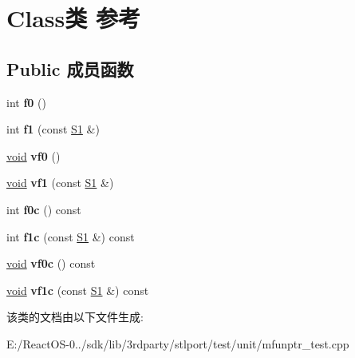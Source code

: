 \hypertarget{class_class}{}\section{Class类 参考}
\label{class_class}
\subsection*{Public 成员函数}
\begin{DoxyCompactItemize}
\item 
\mbox{\label{class_class_a353ea3eeb67127a6c3e4ae54fbd06bc5}} 
int {\bfseries f0} ()
\item 
\mbox{\label{class_class_acc51765c7d55186cfdbc72052833562f}} 
int {\bfseries f1} (const \hyperlink{struct_s1}{S1} \&)
\item 
\mbox{\label{class_class_af91bee0194892bca2c674223ead52f0c}} 
\hyperlink{interfacevoid}{void} {\bfseries vf0} ()
\item 
\mbox{\label{class_class_a3218c22cf7f2fe29a9521f100d56c4f2}} 
\hyperlink{interfacevoid}{void} {\bfseries vf1} (const \hyperlink{struct_s1}{S1} \&)
\item 
\mbox{\label{class_class_a8d3292486ee5c26471b5091d0af575cb}} 
int {\bfseries f0c} () const
\item 
\mbox{\label{class_class_abfe03397c9b9e6dcd3d28a0b7345513f}} 
int {\bfseries f1c} (const \hyperlink{struct_s1}{S1} \&) const
\item 
\mbox{\label{class_class_a0f1cac17cad5942018f5356e43225d6b}} 
\hyperlink{interfacevoid}{void} {\bfseries vf0c} () const
\item 
\mbox{\label{class_class_a6a0d0d2003f5c36247430010b5922faf}} 
\hyperlink{interfacevoid}{void} {\bfseries vf1c} (const \hyperlink{struct_s1}{S1} \&) const
\end{DoxyCompactItemize}


该类的文档由以下文件生成\+:\begin{DoxyCompactItemize}
\item 
E\+:/\+React\+O\+S-\/0../sdk/lib/3rdparty/stlport/test/unit/mfunptr\+\_\+test.\+cpp\end{DoxyCompactItemize}
